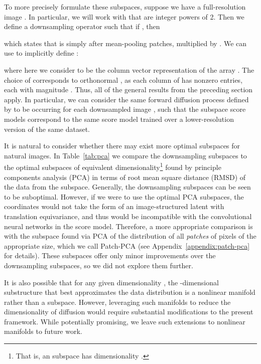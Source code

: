 \documentclass{article}
\begin{document}
To more precisely formulate these subspaces, suppose we have a full-resolution image . In particular, we will work with  that are integer powers of 2. Then we define a downsampling operator  such that if , then

which states that  is simply  after mean-pooling  patches, multiplied by . We can use  to implicitly define :

where here we consider  to be the column vector representation of the array . The choice of  corresponds to orthonormal , as each column of  has  nonzero entries, each with magnitude . Thus, all of the general results from the preceding section apply. In particular, we can consider the same forward diffusion process defined by  to be occurring for each downsampled image , such that the subspace score models   correspond to the same score model trained over a {lower-resolution} version of the same dataset.

It is natural to consider whether there may exist more optimal subspaces for natural images. In Table~\ref{tab:pca} we compare the downsampling subspaces to the optimal subspaces of equivalent dimensionality\footnote{That is, an  subspace has dimensionality .} found by principle components analysis (PCA) in terms of root mean square distance (RMSD) of the data from the subspace. Generally, the downsampling subspaces can be seen to be suboptimal. However, if we were to use the optimal PCA subspaces, the coordinates would not take the form of an image-structured latent with translation equivariance, and thus would be incompatible with the convolutional neural networks in the score model. Therefore, a more appropriate comparison is with the subspace found via PCA of the distribution of all \emph{patches} of pixels of the appropriate size, which we call Patch-PCA (see Appendix~\ref{appendix:patch-pca} for details). These subspaces offer only minor improvements over the downsampling subspaces, so we did not explore them further.

It is also possible that for any given dimensionality , the -dimensional substructure that best approximates the data distribution is a nonlinear manifold rather than a subspace. However, leveraging such manifolds to reduce the dimensionality of diffusion would require substantial modifications to the present framework. While potentially promising, we leave such extensions to nonlinear manifolds to future work.
\end{document}
